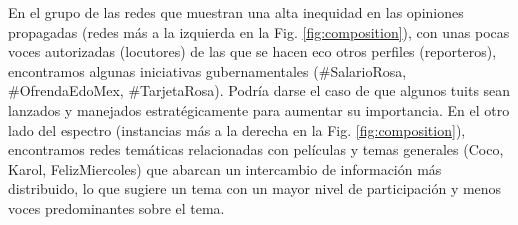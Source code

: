 En el grupo de las redes que muestran una alta inequidad en las opiniones propagadas (redes más a la izquierda en la Fig. \ref{fig:composition}), con unas pocas voces autorizadas (locutores) de las que se hacen eco otros perfiles (reporteros), encontramos algunas iniciativas gubernamentales (\#SalarioRosa, \#OfrendaEdoMex, \#TarjetaRosa). Podría darse el caso de que algunos tuits sean lanzados y manejados estratégicamente para aumentar su importancia. En el otro lado del espectro (instancias más a la derecha en la Fig. \ref{fig:composition}), encontramos redes temáticas relacionadas con películas y temas generales (Coco, Karol, FelizMiercoles) que abarcan un intercambio de información más distribuido, lo que sugiere un tema con un mayor nivel de participación y menos voces predominantes sobre el tema. 

